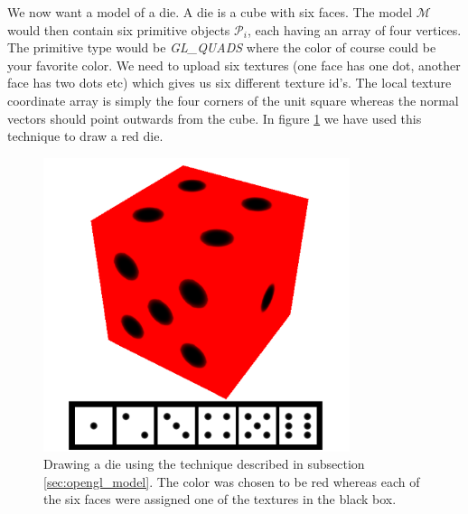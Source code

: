 We now want a model of a die. A die is a cube with six faces. The model $\mathcal M$ would then contain six primitive objects $\mathcal P_i$, each having an array of four vertices. The primitive type would be \textit{GL\_QUADS} where the color of course could be your favorite color. We need to upload six textures (one face has one dot, another face has two dots etc) which gives us six different texture id's. The local texture coordinate array is simply the four corners of the unit square whereas the normal vectors should point outwards from the cube. In figure \ref{fig:opengl_die} we have used this technique to draw a red die.
\begin{figure}[h]
\begin{center}
\includegraphics[width=0.8\textwidth, trim=0cm 0cm 0cm 0cm, clip]{opengl/figures/die.png}
\end{center}
\caption{Drawing a die using the technique described in subsection \ref{sec:opengl_model}. The color was chosen to be red whereas each of the six faces were assigned one of the textures in the black box.}
\label{fig:opengl_die}
\end{figure}